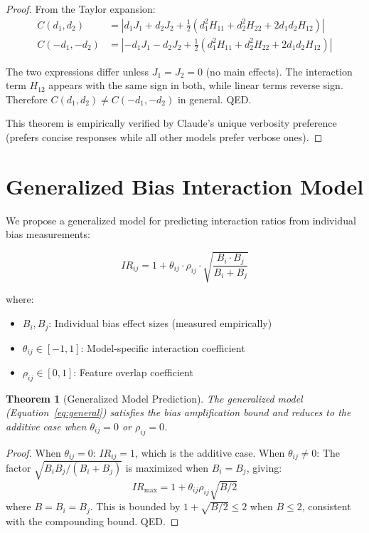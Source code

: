 \documentclass[11pt]{article}
\newtheorem{theorem}{Theorem}
\newtheorem{proof}{Proof}
\begin{document}
\begin{proof}
From the Taylor expansion:
\begin{align}
C(d_1, d_2) &= \left| d_1 J_1 + d_2 J_2 + \frac{1}{2}(d_1^2 H_{11} + d_2^2 H_{22} + 2 d_1 d_2 H_{12}) \right| \\
C(-d_1, -d_2) &= \left| -d_1 J_1 - d_2 J_2 + \frac{1}{2}(d_1^2 H_{11} + d_2^2 H_{22} + 2 d_1 d_2 H_{12}) \right|
\end{align}

The two expressions differ unless $J_1 = J_2 = 0$ (no main effects). The interaction term $H_{12}$ appears with the same sign in both, while linear terms reverse sign. Therefore $C(d_1, d_2) \neq C(-d_1, -d_2)$ in general. QED.

This theorem is empirically verified by Claude's unique verbosity preference (prefers concise responses while all other models prefer verbose ones).
\end{proof}

\section{Generalized Bias Interaction Model}

We propose a generalized model for predicting interaction ratios from individual bias measurements:

\begin{equation}
\label{eq:general}
IR_{ij} = 1 + \theta_{ij} \cdot \rho_{ij} \cdot \sqrt{\frac{B_i \cdot B_j}{B_i + B_j}}
\end{equation}

where:
\begin{itemize}
    \item $B_i, B_j$: Individual bias effect sizes (measured empirically)
    \item $\theta_{ij} \in [-1, 1]$: Model-specific interaction coefficient
    \item $\rho_{ij} \in [0, 1]$: Feature overlap coefficient
\end{itemize}

\begin{theorem}[Generalized Model Prediction]
The generalized model (Equation~\ref{eq:general}) satisfies the bias amplification bound and reduces to the additive case when $\theta_{ij} = 0$ or $\rho_{ij} = 0$.
\end{theorem}

\begin{proof}
When $\theta_{ij} = 0$: $IR_{ij} = 1$, which is the additive case.
When $\theta_{ij} \neq 0$: The factor $\sqrt{B_i B_j / (B_i + B_j)}$ is maximized when $B_i = B_j$, giving:
\begin{equation}
IR_{\max} = 1 + \theta_{ij} \rho_{ij} \sqrt{B/2}
\end{equation}
where $B = B_i = B_j$. This is bounded by $1 + \sqrt{B/2} \leq 2$ when $B \leq 2$, consistent with the compounding bound. QED.
\end{proof}
\end{document}
